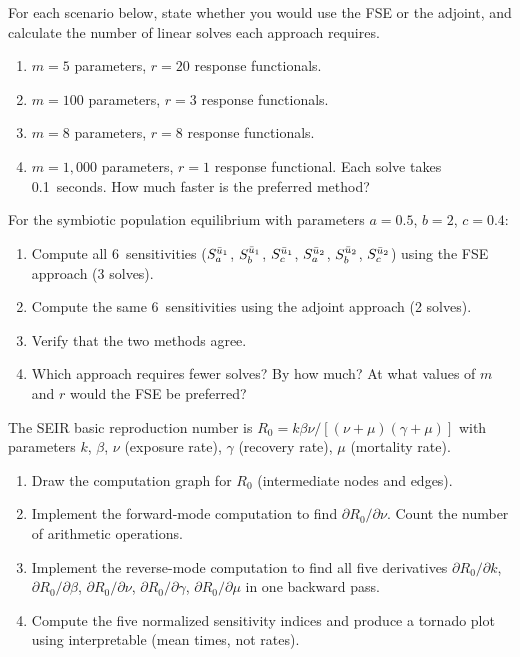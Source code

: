 \begin{exercise}[\bloom{L3}]
\label{ex:ch5:decisionrule}
For each scenario below, state whether you would use the FSE or the adjoint,
and calculate the number of linear solves each approach requires.
\begin{enumerate}[label=(\alph*)]
  \item $m = 5$ parameters, $r = 20$ response functionals.
  \item $m = 100$ parameters, $r = 3$ response functionals.
  \item $m = 8$ parameters, $r = 8$ response functionals.
  \item $m = 1{,}000$ parameters, $r = 1$ response functional.
        Each solve takes 0.1~seconds. How much faster is the preferred method?
\end{enumerate}
\end{exercise}

\begin{exercise}[\bloom{L4}]
\label{ex:ch5:symbiotic}
For the symbiotic population equilibrium with parameters
$a = 0.5$, $b = 2$, $c = 0.4$:
\begin{enumerate}[label=(\alph*)]
  \item Compute all 6~sensitivities ($S_{a}^{\bar{u}_1}$,
        $S_{b}^{\bar{u}_1}$, $S_{c}^{\bar{u}_1}$,
        $S_{a}^{\bar{u}_2}$, $S_{b}^{\bar{u}_2}$, $S_{c}^{\bar{u}_2}$)
        using the FSE approach (3 solves).
  \item Compute the same 6~sensitivities using the adjoint approach (2 solves).
  \item Verify that the two methods agree.
  \item Which approach requires fewer solves? By how much?
        At what values of $m$ and $r$ would the FSE be preferred?
\end{enumerate}
\end{exercise}

\begin{exercise}[\bloom{L4}]
\label{ex:ch5:reverseSEIR}
The SEIR basic reproduction number is
$R_0 = k\beta\nu/[(\nu+\mu)(\gamma+\mu)]$
with parameters $k$, $\beta$, $\nu$ (exposure rate), $\gamma$ (recovery rate),
$\mu$ (mortality rate).
\begin{enumerate}[label=(\alph*)]
  \item Draw the computation graph for $R_0$ (intermediate nodes and edges).
  \item Implement the forward-mode computation to find $\partial R_0/\partial\nu$.
        Count the number of arithmetic operations.
  \item Implement the reverse-mode computation to find all five
        derivatives $\partial R_0/\partial k$, $\partial R_0/\partial\beta$,
        $\partial R_0/\partial\nu$, $\partial R_0/\partial\gamma$,
        $\partial R_0/\partial\mu$ in one backward pass.
  \item Compute the five normalized sensitivity indices and produce a
        tornado plot using interpretable \POIs (mean times, not rates).
\end{enumerate}
\end{exercise}


